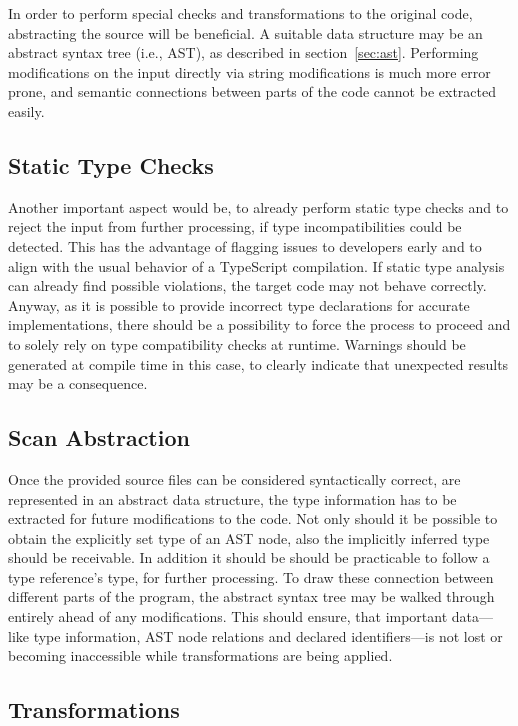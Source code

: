 In order to perform special checks and transformations to the original code, abstracting the source will be beneficial. A suitable data structure may be an abstract syntax tree (i.e., AST), as described in section~\ref{sec:ast}. Performing modifications on the input directly via string modifications is much more error prone, and semantic connections between parts of the code cannot be extracted easily.

\subsection{Static Type Checks}

Another important aspect would be, to already perform static type checks and to reject the input from further processing, if type incompatibilities could be detected. This has the advantage of flagging issues to developers early and to align with the usual behavior of a TypeScript compilation. If static type analysis can already find possible violations, the target code may not behave correctly. Anyway, as it is possible to provide incorrect type declarations for accurate implementations, there should be a possibility to force the process to proceed and to solely rely on type compatibility checks at runtime. Warnings should be generated at compile time in this case, to clearly indicate that unexpected results may be a consequence.

\subsection{Scan Abstraction}

Once the provided source files can be considered syntactically correct, are represented in an abstract data structure, the type information has to be extracted for future modifications to the code. Not only should it be possible to obtain the explicitly set type of an AST node, also the implicitly inferred type should be receivable. In addition it should be should be practicable to follow a type reference's type, for further processing. To draw these connection between different parts of the program, the abstract syntax tree may be walked through entirely ahead of any modifications. This should ensure, that important data---like type information, AST node relations and declared identifiers---is not lost or becoming inaccessible while transformations are being applied.

\subsection{Transformations}

